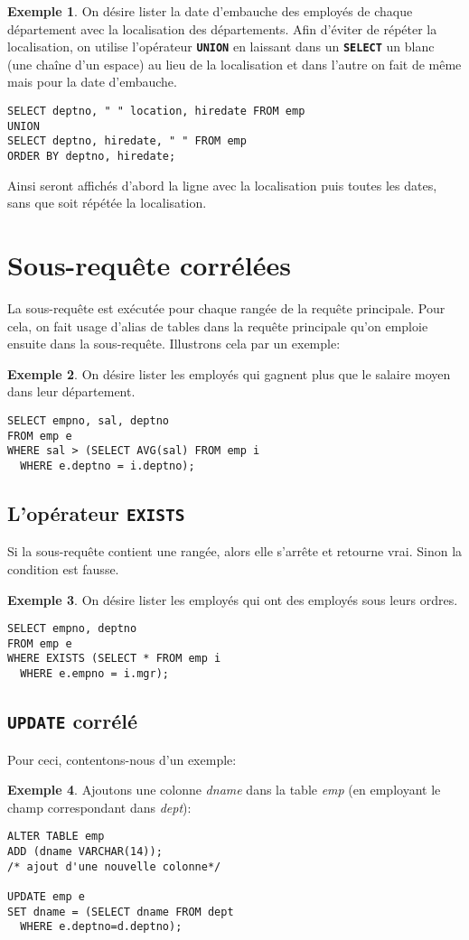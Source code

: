\documentclass[a4paper, 12pt]{report}
\newcommand{\textSQL}[1]{\texttt{\textbf{#1}}}
\theoremstyle{definition} \newtheorem{ex}{Exemple}
\begin{document}
\begin{ex} \label{ex:blancs}
On désire lister la date d'embauche des employés de chaque département avec la localisation des départements. Afin d'éviter de répéter la localisation, on utilise l'opérateur \textSQL{UNION} en laissant dans un \textSQL{SELECT} un blanc (une chaîne d'un espace) au lieu de la localisation et dans l'autre on fait de même mais pour la date d'embauche. 
\begin{lstlisting}[frame=single]
SELECT deptno, " " location, hiredate FROM emp
UNION
SELECT deptno, hiredate, " " FROM emp
ORDER BY deptno, hiredate;
\end{lstlisting} 
Ainsi seront affichés d'abord la ligne avec la localisation puis toutes les dates, sans que soit répétée la localisation.
\end{ex}

\section{Sous-requête corrélées}
La sous-requête est exécutée pour chaque rangée de la requête principale. Pour cela, on fait usage d'alias de tables dans la requête principale qu'on emploie ensuite dans la sous-requête. Illustrons cela par un exemple:
\begin{ex}
On désire lister les employés qui gagnent plus que le salaire moyen dans leur département.
\begin{lstlisting}[frame=single]
SELECT empno, sal, deptno
FROM emp e
WHERE sal > (SELECT AVG(sal) FROM emp i
  WHERE e.deptno = i.deptno);
\end{lstlisting}
\end{ex}

\subsection*{L'opérateur \textSQL{EXISTS}}

Si la sous-requête contient une rangée, alors elle s'arrête et retourne vrai. Sinon la condition est fausse.
\begin{ex}
On désire lister les employés qui ont des employés sous leurs ordres.
\begin{lstlisting}[frame=single]
SELECT empno, deptno
FROM emp e
WHERE EXISTS (SELECT * FROM emp i
  WHERE e.empno = i.mgr);
\end{lstlisting}
\end{ex}


\subsection*{\textSQL{UPDATE} corrélé}

Pour ceci, contentons-nous d'un exemple:
\begin{ex}
Ajoutons une colonne \emph{dname} dans la table \emph{emp} (en employant le champ correspondant dans \emph{dept}):
\begin{lstlisting}[frame=single]
ALTER TABLE emp
ADD (dname VARCHAR(14));
/* ajout d'une nouvelle colonne*/

UPDATE emp e
SET dname = (SELECT dname FROM dept
  WHERE e.deptno=d.deptno);
\end{lstlisting}
\end{ex}
\end{document}
